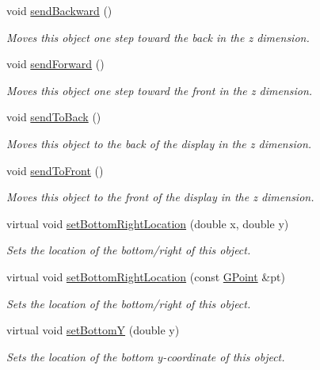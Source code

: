 \begin{DoxyCompactItemize}
void \mbox{\hyperlink{classsgl_1_1GObject_ab6747f40313c531c2db32edb5b63b9b7}{send\+Backward}} ()
\begin{DoxyCompactList}\small\item\em Moves this object one step toward the back in the {\itshape z} dimension. \end{DoxyCompactList}\item 
void \mbox{\hyperlink{classsgl_1_1GObject_a710b3e449c9facba7847c91ab170d281}{send\+Forward}} ()
\begin{DoxyCompactList}\small\item\em Moves this object one step toward the front in the {\itshape z} dimension. \end{DoxyCompactList}\item 
void \mbox{\hyperlink{classsgl_1_1GObject_a0f7f1efbb7fd46dde2867c4ad0330896}{send\+To\+Back}} ()
\begin{DoxyCompactList}\small\item\em Moves this object to the back of the display in the {\itshape z} dimension. \end{DoxyCompactList}\item 
void \mbox{\hyperlink{classsgl_1_1GObject_aee33d68488e46827ef55fac07f40a9b2}{send\+To\+Front}} ()
\begin{DoxyCompactList}\small\item\em Moves this object to the front of the display in the {\itshape z} dimension. \end{DoxyCompactList}\item 
virtual void \mbox{\hyperlink{classsgl_1_1GObject_a71ff7b16b8f1bdc4a1ce9f30cf8b87d8}{set\+Bottom\+Right\+Location}} (double x, double y)
\begin{DoxyCompactList}\small\item\em Sets the location of the bottom/right of this object. \end{DoxyCompactList}\item 
virtual void \mbox{\hyperlink{classsgl_1_1GObject_ac6f7320321182f1d18c1c0fa97d5e941}{set\+Bottom\+Right\+Location}} (const \mbox{\hyperlink{structsgl_1_1GPoint}{G\+Point}} \&pt)
\begin{DoxyCompactList}\small\item\em Sets the location of the bottom/right of this object. \end{DoxyCompactList}\item 
virtual void \mbox{\hyperlink{classsgl_1_1GObject_a4b20e93c2a2597484f74ee5caa71f41f}{set\+BottomY}} (double y)
\begin{DoxyCompactList}\small\item\em Sets the location of the bottom y-\/coordinate of this object. \end{DoxyCompactList}\item 

\end{DoxyCompactItemize}
